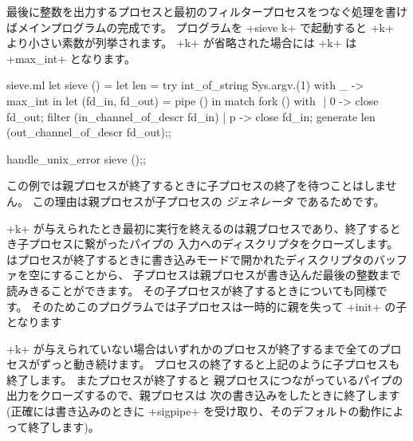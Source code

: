 最後に整数を出力するプロセスと最初のフィルタープロセスをつなぐ処理を書けばメインプログラムの完成です。
プログラムを \ml+sieve k+ で起動すると \ml+k+ より小さい素数が列挙されます。
\ml+k+ が省略された場合には \ml+k+ は \ml+max_int+ となります。
%
\begin{listingcodefile}[style=numbers]{sieve.ml}
let sieve () =
  let len = try int_of_string Sys.argv.(1) with _ -> max_int in
  let (fd_in, fd_out) = pipe () in
  match fork () with $\label{prog:sievefork}$
  | 0 ->
      close fd_out;
      filter (in_channel_of_descr fd_in)
  | p ->
      close fd_in;
      generate len (out_channel_of_descr fd_out);; $\label{prog:gen}$

handle_unix_error sieve ();;
\end{listingcodefile}
%

この例では親プロセスが終了するときに子プロセスの終了を待つことはしません。
この理由は親プロセスが子プロセスの \emph{ジェネレータ} であるためです。

\ml+k+ が与えられたとき最初に実行を終えるのは親プロセスであり、終了するとき子プロセスに繋がったパイプの
入力へのディスクリプタをクローズします。
\ocaml はプロセスが終了するときに書き込みモードで開かれたディスクリプタのバッファを空にすることから、
子プロセスは親プロセスが書き込んだ最後の整数まで読みきることができます。
その子プロセスが終了するときについても同様です。
そのためこのプログラムでは子プロセスは一時的に親を失って \ml+init+ の子となります

\ml+k+ が与えられていない場合はいずれかのプロセスが終了するまで全てのプロセスがずっと動き続けます。
プロセスの終了すると上記のように子プロセスも終了します。
またプロセスが終了すると
親プロセスにつながっているパイプの出力をクローズするので、親プロセスは
次の書き込みをしたときに終了します (正確には書き込みのときに \ml+sigpipe+ を受け取り、そのデフォルトの動作によって終了します)。


